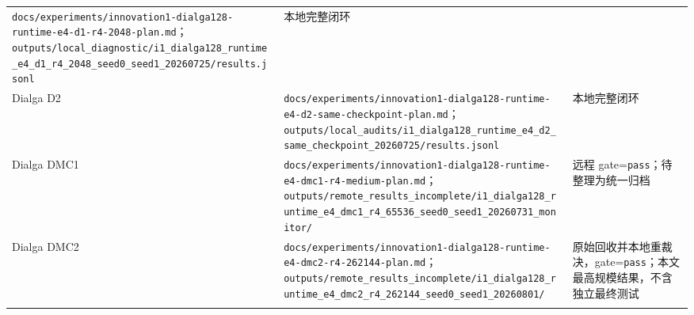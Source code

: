 \documentclass[
  a4paper,
  UTF8]{ctexart}
\begin{document}
\begin{longtable}[]{@{}lll@{}}
\begin{minipage}[t]{0.30\columnwidth}
\nolinkurl{docs/experiments/innovation1-dialga128-runtime-e4-d1-r4-2048-plan.md}；\nolinkurl{outputs/local_diagnostic/i1_dialga128_runtime_e4_d1_r4_2048_seed0_seed1_20260725/results.jsonl}\strut
\end{minipage} & \begin{minipage}[t]{0.30\columnwidth}\raggedright
本地完整闭环\strut
\end{minipage}\tabularnewline
\begin{minipage}[t]{0.30\columnwidth}\raggedright
Dialga D2\strut
\end{minipage} & \begin{minipage}[t]{0.30\columnwidth}\raggedright
\nolinkurl{docs/experiments/innovation1-dialga128-runtime-e4-d2-same-checkpoint-plan.md}；\nolinkurl{outputs/local_audits/i1_dialga128_runtime_e4_d2_same_checkpoint_20260725/results.jsonl}\strut
\end{minipage} & \begin{minipage}[t]{0.30\columnwidth}\raggedright
本地完整闭环\strut
\end{minipage}\tabularnewline
\begin{minipage}[t]{0.30\columnwidth}\raggedright
Dialga DMC1\strut
\end{minipage} & \begin{minipage}[t]{0.30\columnwidth}\raggedright
\nolinkurl{docs/experiments/innovation1-dialga128-runtime-e4-dmc1-r4-medium-plan.md}；\nolinkurl{outputs/remote_results_incomplete/i1_dialga128_runtime_e4_dmc1_r4_65536_seed0_seed1_20260731_monitor/}\strut
\end{minipage} & \begin{minipage}[t]{0.30\columnwidth}\raggedright
远程 gate=\texttt{pass}；待整理为统一归档\strut
\end{minipage}\tabularnewline
\begin{minipage}[t]{0.30\columnwidth}\raggedright
Dialga DMC2\strut
\end{minipage} & \begin{minipage}[t]{0.30\columnwidth}\raggedright
\nolinkurl{docs/experiments/innovation1-dialga128-runtime-e4-dmc2-r4-262144-plan.md}；\nolinkurl{outputs/remote_results_incomplete/i1_dialga128_runtime_e4_dmc2_r4_262144_seed0_seed1_20260801/}\strut
\end{minipage} & \begin{minipage}[t]{0.30\columnwidth}\raggedright
原始回收并本地重裁决，gate=\texttt{pass}；本文最高规模结果，不含独立最终测试\strut
\end{minipage}\tabularnewline
\begin{minipage}[t]{0.30\columnwidth}\raggedright

\end{minipage}
\end{longtable}
\end{document}
